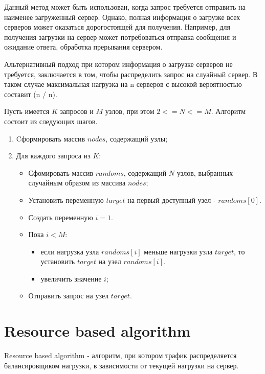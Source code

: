 Данный метод может быть использован, когда запрос требуется отправить на наименее загруженный сервер. 
Однако, полная информация о загрузке всех серверов может оказаться дорогостоящей для получения. 
Например, для получения загрузки на сервер может потребоваться отправка сообщения и ожидание ответа, 
обработка прерывания сервером. \cite{pwr2choices}

Альтернативный подход при котором информация о загрузке серверов не требуется, заключается в том, чтобы распределить запрос на слуайный сервер.
В таком случае максимальная нагрузка на n серверов с высокой вероятностью составит \Theta(\log n / \log \log n). \cite{pwr2choices}

Пусть имеется $K$ запросов и $M$ узлов, при этом $2 <= N <= M$. Алгоритм состоит из следующих шагов.

\begin{enumerate}
    \item Cформировать массив $nodes$, содержащий узлы;
    \item Для каждого запроса из $K$:
    \begin{itemize}
        \item Сфомировать массив $randoms$, содержащий $N$ узлов, выбранных случайным образом из массива $nodes$;
        \item Установить переменную $target$ на первый доступный узел - $randoms[0]$.
	    \item Создать переменную $i = 1$.
        \item Пока $i < M$:
        \begin{itemize}
            \item если нагрузка узла $randoms[i]$ меньше нагрузки узла $target$, то установить $target$ на узел $randoms[i]$.
		    \item увеличить значение $i$;
        \end{itemize}
        \item Отправить запрос на узел $target$.
	\end{itemize}
\end{enumerate}

\section{Resource based algorithm}

Resource based algorithm - алгоритм, при котором трафик распределяется балансировщиком нагрузки, в зависимости от текущей нагрузки на сервер. \cite{whatislb}

